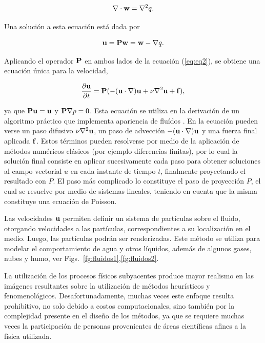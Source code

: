 \begin{equation}
\label{eq:eq4}
\nabla\cdot\bold{w} = \nabla^{2} q.
\end{equation}

Una solución a esta ecuación está dada por

\begin{equation}
\label{eq:eq5}
\bold{u} = \bold{P}\bold{w} = \bold{w} - \nabla q.
\end{equation}

Aplicando el operador $\bold{P}$ en ambos lados de la ecuación (\ref{eq:eq2}), se obtiene una ecuación única para la velocidad,

\begin{equation}
\frac{\partial \bold{u} }{\partial t} = \bold{P} (- (\bold{u} \cdot \nabla) \bold{u} + \nu \nabla^{2} \bold{u} + \bold{f}) \label{eq:eq6},
\end{equation}

\noindent ya que $\bold{P}\bold{u} = \bold{u}$ y $\bold{P}\nabla p = 0$.
Esta ecuación se utiliza en la derivación de un algoritmo práctico que implementa apariencia de fluídos \cite{Stam1999}.
En la ecuación pueden verse un paso difusivo $\nu \nabla^{2} \bold{u}$, un paso de advección $- (\bold{u} \cdot \nabla) \bold{u}$ y una fuerza final aplicada $\bold{f}$.
Estos términos pueden resolverse por medio de la aplicación de métodos numéricos clásicos (por ejemplo diferencias finitas), por lo cual la solución final consiste en aplicar sucesivamente cada paso para obtener soluciones al campo vectorial $u$ en cada instante de tiempo $t$, finalmente proyectando el resultado con $P$.
El paso más complicado lo constituye el paso de proyección $P$, el cual se resuelve por medio de sistemas lineales, teniendo en cuenta que la misma constituye una ecuación de Poisson.

Las velocidades $\bold{u}$ permiten definir un sistema de partículas sobre el fluido, otorgando velocidades a las partículas, correspondientes a su localización en el medio.
Luego, las partículas podrán ser renderizadas.
Este método se utiliza para modelar el comportamiento de agua y otros líquidos, además de algunos gases, nubes y humo, ver Figs.~\ref{fg:fluidos1},\ref{fg:fluidos2}.

La utilización de los procesos físicos subyacentes produce mayor realismo en las imágenes resultantes sobre la utilización de métodos heurísticos y fenomenológicos.
Desafortunadamente, muchas veces este enfoque resulta prohibitivo, no solo debido a costos computacionales, sino también por la complejidad presente en el diseño de los métodos, ya que se requiere muchas veces la participación de personas provenientes de áreas científicas afines a la física utilizada.


